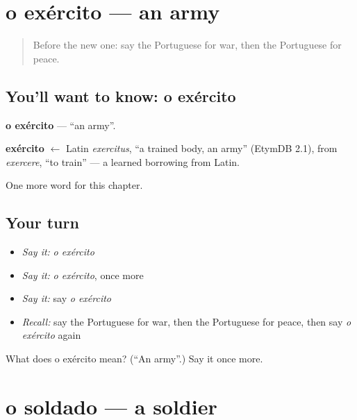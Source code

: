 \section[o exército]{o exército — an army}

\label{lesson:PT-C219-exercito}



\begin{quote}
Before the new one: say the Portuguese for war, then the Portuguese for peace.
\end{quote}

\subsection*{You'll want to know: o exército}
\textbf{o exército} — \textquotedblleft{}an army\textquotedblright{}.

\begin{cousinweb}
\textbf{exército} $\leftarrow$ Latin \emph{exercitus}, \textquotedblleft{}a trained body, an army\textquotedblright{} (EtymDB 2.1), from \emph{exercere}, \textquotedblleft{}to train\textquotedblright{} — a learned borrowing from Latin.
\end{cousinweb}

\begin{grammarlens}[title={What you've built}]
One more word for this chapter.
\end{grammarlens}

\subsection*{Your turn}
\begin{itemize}
\raggedright
  \item \emph{Say it:} \emph{o exército}
  \item \emph{Say it:} \emph{o exército}, once more
  \item \emph{Say it:} say \emph{o exército}
  \item \emph{Recall:} say the Portuguese for war, then the Portuguese for peace, then say \emph{o exército} again
\end{itemize}

\begin{tcolorbox}[breakable,colback=teal!4,colframe=teal!35!black,title={Before you move on}]
What does o exército mean? (\textquotedblleft{}An army\textquotedblright{}.) Say it once more.
\end{tcolorbox}
\section[o soldado]{o soldado — a soldier}

